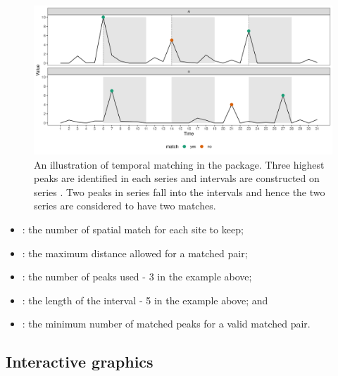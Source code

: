 \documentclass[
  shortnames]{jss}
\providecommand{\tightlist}{%
  \setlength{\itemsep}{0pt}\setlength{\parskip}{0pt}}
\begin{document}
\begin{CodeChunk}
\begin{figure}

{\centering \includegraphics[width=1\linewidth]{../figures/illu-matching} 

}

\caption{An illustration of temporal matching in the  package. Three highest peaks are identified in each series and intervals are constructed on series . Two peaks in series  fall into the intervals and hence the two series are considered to have two matches.}\label{fig:illu-matching}
\end{figure}
\end{CodeChunk}

\begin{itemize}
\tightlist
\item
  : the number of spatial match for each site to keep;
\item
  : the maximum distance allowed for a matched pair;
\item
  : the number of peaks used - 3 in the example above;
\item
  : the length of the interval - 5 in the example above; and
\item
  : the minimum number of matched peaks for a valid matched pair.
\end{itemize}

\hypertarget{interactive-graphics}{%
\subsection{Interactive graphics}\label{interactive-graphics}}
\end{document}
